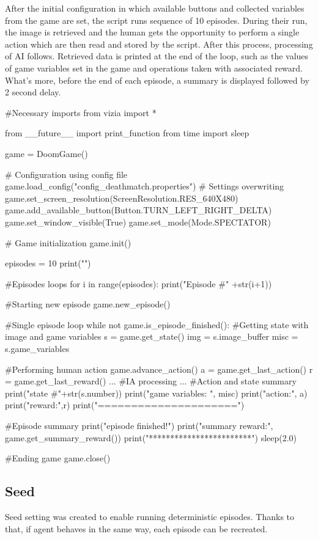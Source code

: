 \documentclass[english,bachelor,a4paper,twoside]{ppfcmthesis}
\begin{document}
After the initial configuration in which available buttons and collected variables from the game are set, the script runs sequence of 10 episodes. During their run, the image is retrieved and the human gets the opportunity to perform a single action which are then read and stored by the script. After this process, processing of AI follows. Retrieved data is printed at the end of the loop, such as the values of game variables set in the game and operations taken with associated reward. What's more, before the end of each episode, a summary is displayed followed by 2 second delay.

\begin{pblock}
#Necessary imports
from vizia import *

from __future__ import print_function
from time import sleep

game = DoomGame()

# Configuration using config file
game.load_config("config_deathmatch.properties")
# Settings overwriting 
game.set_screen_resolution(ScreenResolution.RES_640X480)
game.add_available_button(Button.TURN_LEFT_RIGHT_DELTA)
game.set_window_visible(True)
game.set_mode(Mode.SPECTATOR)

# Game initialization 
game.init()

episodes = 10
print("")

#Episodes loops
for i in range(episodes):
	print("Episode #" +str(i+1))
	
	#Starting new episode
	game.new_episode()

	#Single episode loop
	while not game.is_episode_finished():
		#Getting state with image and game variables
		s = game.get_state()
		img = s.image_buffer
		misc = s.game_variables

		#Performing human action
		game.advance_action()
		a = game.get_last_action()
		r = game.get_last_reward()
		...		
		#IA processing
		...
		#Action and state summary
		print("state #"+str(s.number))
		print("game variables: ", misc)
		print("action:", a)
		print("reward:",r)
		print("=====================")

	#Episode summary
	print("episode finished!")
	print("summary reward:", game.get_summary_reward())
	print("************************")
	sleep(2.0)

#Ending game
game.close()
\end{pblock}

\subsection {Seed}
	Seed setting was created to enable running deterministic episodes. Thanks to that, if agent behaves in the same way, each episode can be recreated.
\end{document}
